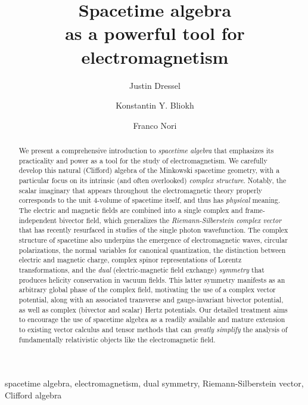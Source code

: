 \documentclass[1p,sort&compress]{elsarticle}
\numberwithin{equation}{section}
\begin{document}
\begin{frontmatter}
\title{Spacetime algebra \\as a powerful tool for electromagnetism}
\author[river,cems]{Justin Dressel}
\author[cems,itsrg]{Konstantin Y. Bliokh}
\author[cems,umich]{Franco Nori}
\address[river]{Department of Electrical and Computer Engineering, \\University of California, Riverside, CA 92521, USA}
\address[cems]{Center for Emergent Matter Science (CEMS), RIKEN, Wako-shi, Saitama, 351-0198, Japan}
\address[itsrg]{Interdisciplinary Theoretical Science Research Group (iTHES), RIKEN, Wako-shi, Saitama, 351-0198, Japan}
\address[umich]{Physics Department, University of Michigan, Ann Arbor, MI 48109-1040, USA}

\begin{abstract}
  We present a comprehensive introduction to \emph{spacetime algebra} that emphasizes its practicality and power as a tool for the study of electromagnetism. We carefully develop this natural (Clifford) algebra of the Minkowski spacetime geometry, with a particular focus on its intrinsic (and often overlooked) \emph{complex structure}. Notably, the scalar imaginary that appears throughout the electromagnetic theory properly corresponds to the unit 4-volume of spacetime itself, and thus has \emph{physical} meaning. The electric and magnetic fields are combined into a single complex and frame-independent bivector field, which generalizes the \emph{Riemann-Silberstein complex vector} that has recently resurfaced in studies of the single photon wavefunction. The complex structure of spacetime also underpins the emergence of electromagnetic waves, circular polarizations, the normal variables for canonical quantization, the distinction between electric and magnetic charge, complex spinor representations of Lorentz transformations, and the \emph{dual} (electric-magnetic field exchange) \emph{symmetry} that produces helicity conservation in vacuum fields.  This latter symmetry manifests as an arbitrary global phase of the complex field, motivating the use of a complex vector potential, along with an associated transverse and gauge-invariant bivector potential, as well as complex (bivector and scalar) Hertz potentials.  Our detailed treatment aims to encourage the use of spacetime algebra as a readily available and mature extension to existing vector calculus and tensor methods that can \emph{greatly simplify} the analysis of fundamentally relativistic objects like the electromagnetic field. 
\end{abstract}

\begin{keyword}
  spacetime algebra, electromagnetism, dual symmetry, Riemann-Silberstein vector, Clifford algebra
\end{keyword}
\end{frontmatter}
\end{document}
